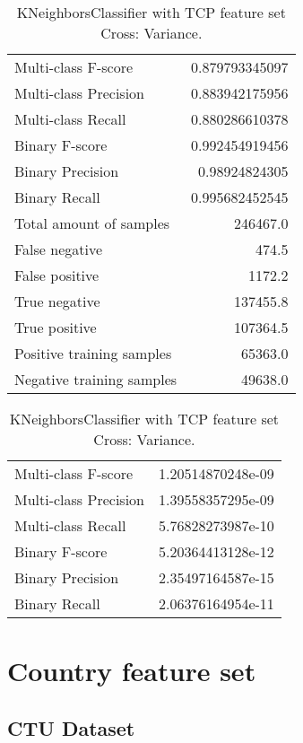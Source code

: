 \begin{table}[H]
\begin{minipage}{0.5\textwidth}
\caption{KNeighborsClassifier with TCP feature set Cross: Average.}
\centering
\begin{tabular}{l r}
\toprule
Multi-class F-score & 0.879793345097 \\
Multi-class Precision & 0.883942175956 \\
Multi-class Recall & 0.880286610378 \\
\midrule
Binary F-score & 0.992454919456 \\
Binary Precision & 0.98924824305 \\
Binary Recall & 0.995682452545 \\
\midrule
Total amount of samples & 246467.0 \\
False negative & 474.5 \\
False positive & 1172.2 \\
True negative & 137455.8 \\
True positive & 107364.5 \\
\midrule
Positive training samples & 65363.0 \\
Negative training samples & 49638.0 \\
\bottomrule
\end{tabular}
\end{minipage}
\hfillx
\begin{minipage}{0.5\textwidth}
\caption{KNeighborsClassifier with TCP feature set Cross: Variance.}
\centering
\begin{tabular}{l r}
\toprule
Multi-class F-score & 1.20514870248e-09 \\
Multi-class Precision & 1.39558357295e-09 \\
Multi-class Recall & 5.76828273987e-10 \\
\midrule
Binary F-score & 5.20364413128e-12 \\
Binary Precision & 2.35497164587e-15 \\
Binary Recall & 2.06376164954e-11 \\
\bottomrule
\end{tabular}
\end{minipage}
\end{table}

\newpage
\section{Country feature set}
\subsection{CTU Dataset}

